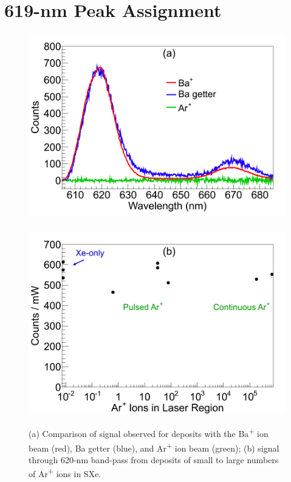 

\section{619-nm Peak Assignment}
\label{sec:619identification}

\begin{figure} %
        \centering
                \includegraphics[width=.5\textwidth]{figures/Ar_vs_Ba.png}
                ~
                \includegraphics[width=.5\textwidth]{figures/ArImaging.png}
                \caption{(a) Comparison of signal observed for deposits with the Ba\textsuperscript{+} ion beam (red), Ba getter (blue), and Ar\textsuperscript{+} ion beam (green); (b) signal through 620-nm band-pass from deposits of small to large numbers of Ar\textsuperscript{+} ions in SXe.}
\label{fig:ArVsBa}
\end{figure}

